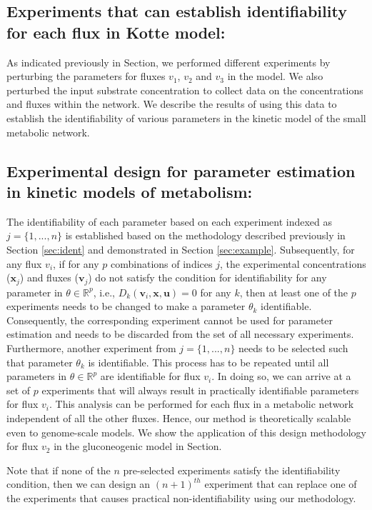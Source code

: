 \documentclass[10pt]{article}
\begin{document}
\subsection{Experiments that can establish identifiability for each flux in Kotte model:}	
As indicated previously in Section, we performed different experiments by perturbing the parameters for fluxes $v_1$, $v_2$ and $v_3$ in the model. We also perturbed the input substrate concentration to collect data on the concentrations and fluxes within the network. We describe the results of using this data to establish the identifiability of various parameters in the kinetic model of the small metabolic network.



\subsection{Experimental design for parameter estimation in kinetic models of metabolism:}
The identifiability of each parameter based on each experiment indexed as $j = \{1, ..., n\}$ is established based on the methodology described previously in Section \ref{sec:ident} and demonstrated in Section \ref{sec:example}. Subsequently, for any flux $v_i$, if for any $p$ combinations of indices $j$, the experimental concentrations ($\mathbf{x}_j$) and fluxes ($\mathbf{v}_j$) do not satisfy the condition for identifiability for any parameter in $\theta\in\mathbb{R}^p$, i.e., $D_k(\mathbf{v}_i, \mathbf{x}, \mathbf{u}) = 0$ for any $k$, then at least one of the $p$ experiments needs to be changed to make a parameter $\theta_k$ identifiable. Consequently, the corresponding experiment cannot be used for parameter estimation and needs to be discarded from the set of all necessary experiments. Furthermore, another experiment from $j = \{1, ..., n\}$ needs to be selected such that parameter $\theta_k$ is identifiable. This process has to be repeated until all parameters in $\theta\in\mathbb{R}^p$ are identifiable for flux $v_i$. In doing so, we can arrive at a set of $p$ experiments that will always result in practically identifiable parameters for flux $v_i$. This analysis can be performed for each flux in a metabolic network independent of all the other fluxes. Hence, our method is theoretically scalable even to genome-scale models. We show the application of this design methodology for flux $v_2$ in the gluconeogenic model in Section.

Note that if none of the $n$ pre-selected experiments satisfy the identifiability condition, then we can design an $(n+1)^{th}$ experiment that can replace one of the experiments that causes practical non-identifiability using our methodology. 
\end{document}
